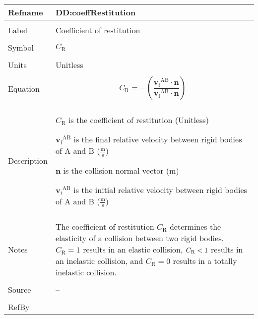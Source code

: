 \documentclass[12pt]{article}
\newcommand{\lt}{\ensuremath <}
\begin{document}
\vspace{\baselineskip}
\noindent
\begin{minipage}{\textwidth}
\begin{tabular}{>{\raggedright}p{}>{\raggedright\arraybackslash}p{}}
\toprule \textbf{Refname} & \textbf{DD:coeffRestitution}
\label{DD:coeffRestitution}
\\ \midrule \\
Label & Coefficient of restitution
        
\\ \midrule \\
Symbol & ${C_{\text{R}}}$
         
\\ \midrule \\
Units & Unitless
        
\\ \midrule \\
Equation & \begin{displaymath}
           {C_{\text{R}}}=-\left(\frac{{{\symbf{v}_{\text{f}}}^{\text{A}\text{B}}}\cdot{}\symbf{n}}{{{\symbf{v}_{\text{i}}}^{\text{A}\text{B}}}\cdot{}\symbf{n}}\right)
           \end{displaymath}
\\ \midrule \\
Description & \begin{symbDescription}
              \item{${C_{\text{R}}}$ is the coefficient of restitution (Unitless)}
              \item{${{\symbf{v}_{\text{f}}}^{\text{A}\text{B}}}$ is the final relative velocity between rigid bodies of A and B ($\frac{\text{m}}{\text{s}}$)}
              \item{$\symbf{n}$ is the collision normal vector (${\text{m}}$)}
              \item{${{\symbf{v}_{\text{i}}}^{\text{A}\text{B}}}$ is the initial relative velocity between rigid bodies of A and B ($\frac{\text{m}}{\text{s}}$)}
              \end{symbDescription}
\\ \midrule \\
Notes & The coefficient of restitution ${C_{\text{R}}}$ determines the elasticity of a collision between two rigid bodies. ${C_{\text{R}}}=1$ results in an elastic collision, ${C_{\text{R}}}\lt{}1$ results in an inelastic collision, and ${C_{\text{R}}}=0$ results in a totally inelastic collision.
        
\\ \midrule \\
Source & --
         
\\ \midrule \\
RefBy & 
\\ \bottomrule
\end{tabular}
\end{minipage}
\end{document}

